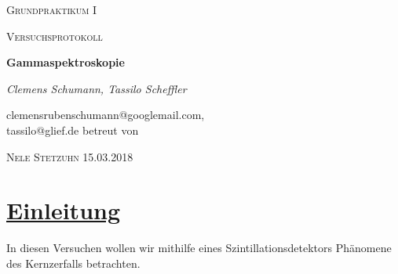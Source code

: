 \documentclass[11pt,a4paper]{article}
\begin{document}
 \begin{center}
  {\scshape\LARGE Grundpraktikum I \par}
  \vshape{1cm}
  {\scshape\Large Versuchsprotokoll\par}
  \vspace{1.5cm}
  {\huge\bfseries Gammaspektroskopie\par}
  \vspace{2cm}
  {\large \itshape{Clemens Schumann, Tassilo Scheffler}\/ \par}
  \vspace{0.5cm}
  {clemensrubenschumann@googlemail.com, \\ tassilo@glief.de}
  \vfill
  betreut von\par
  \textsc{Nele Stetzuhn}
  \vfill
  {\Large 15.03.2018}

  \end{center}

  \thispagestyle{empty}
 \newpage
 \setcounter{page}{1}
 \tableofcontents
 \newpage
 \section{\underline{Einleitung}}
  In diesen Versuchen wollen wir mithilfe eines Szintillationsdetektors
  Ph\"anomene des Kernzerfalls betrachten.
\end{document}
